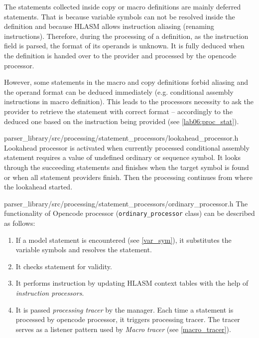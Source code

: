 The statements collected inside copy or macro definitions are mainly deferred statements. That is because variable symbols can not be resolved inside the definition and because HLASM allows instruction aliasing (renaming instructions). Therefore, during the processing of a definition, as the instruction field is parsed, the format of its operands is unknown. It is fully deduced when the definition is handed over to the provider and processed by the opencode processor.

However, some statements in the macro and copy definitions forbid aliasing and the operand format can be deduced immediately (e.g. conditional assembly instructions in macro definition). This leads to the processors necessity to ask the provider to retrieve the statement with correct format -- accordingly to the deduced one based on the instruction being provided  (see \cref{lab06:proc_stat}).

{parser\_library/src/processing/statement\_processors/lookahead\_processor.h}
\label{lab06:look}
Lookahead processor is activated when currently processed conditional assembly statement requires a value of undefined ordinary or sequence symbol. It looks through the succeeding statements and finishes when the target symbol is found or when all statement providers finish. Then the processing continues from where the lookahead started.

{parser\_library/src/processing/statement\_processors/ordinary\_processor.h}
\label{ord_proc}
The functionality of Opencode processor (\texttt{ordinary\_processor} class) can be described as follows:
\begin{enumerate}
	\item If a model statement is encountered (see \cref{var_sym}), it substitutes the variable symbols and resolves the statement.
	\item It checks statement for validity.
	\item It performs instruction by updating HLASM context tables with the help of \emph{instruction processors}.
	\item It is passed \emph{processing tracer} by the manager. Each time a statement is processed by opencode processor, it triggers processing tracer. The tracer serves as a listener pattern used by \emph{Macro tracer} (see \cref{macro_tracer}).
\end{enumerate}

\vspace{0.5cm}


